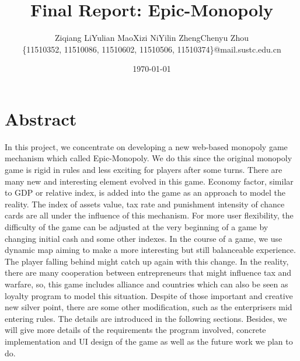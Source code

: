 \documentclass[a4paper,12pt]{article}
\begin{document}

\title{Final Report: Epic-Monopoly}
\author{\small Ziqiang Li\quad Yulian Mao\quad Xizi Ni\quad Yilin Zheng\quad Chenyu Zhou\\
\small \{11510352, 11510086, 11510602, 11510506, 11510374\}@mail.sustc.edu.cn}
\date{\today}



\maketitle


\section{Abstract}
\lettrine[lines=2,loversize=0.35,lraise=0.07,findent=3pt,nindent=2pt]{I}{}n this project, we concentrate on developing a new web-based monopoly game mechanism which called Epic-Monopoly. We do this since the original monopoly game is rigid in rules and less exciting for players after some turns. There are many new and interesting element evolved in this game. Economy factor, similar to GDP or relative index, is added into the game as an approach to model the reality. The index of assets value, tax rate and punishment intensity of chance cards are all under the influence of this mechanism. For more user flexibility, the difficulty of the game can be adjusted at the very beginning of a game by changing initial cash and some other indexes. In the course of a game, we use dynamic map aiming to make a more interesting but still balanceable experience. The player falling behind might catch up again with this change. In the reality, there are many cooperation between entrepreneurs that might influence tax and warfare, so, this game includes alliance and countries which can also be seen as loyalty program to model this situation. Despite of those important and creative new silver point, there are some other modification, such as the enterprisers mid entering rules. The details are introduced in the following sections. Besides, we will give more details of the requirements the program involved, concrete implementation and UI design of the game as well as the future work we plan to do. 
\end{document}
